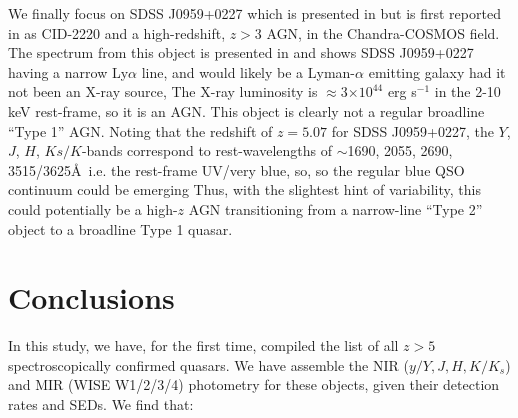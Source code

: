\documentclass[usenatbib]{mnras}
\begin{document}
We finally focus on SDSS J0959+0227 which is presented in
\citet{WangF2016} but is first reported in \citet{Civano2011} as
CID-2220 and a high-redshift, $z>3$ AGN, in the Chandra-COSMOS
field. The spectrum from this object is presented in \citet{Ikeda2012}
and shows SDSS J0959+0227 having a narrow Ly$\alpha$ line, and would
likely be a Lyman-$\alpha$ emitting galaxy had it not been an X-ray
source, The X-ray luminosity is $\approx$3$\times10^{44}$ erg s$^{-1}$
in the 2-10 keV rest-frame, so it is an AGN. This object is clearly
not a regular broadline ``Type 1'' AGN. Noting that the redshift of
$z=5.07$ for SDSS J0959+0227, the $Y$, $J$, $H$, $Ks/K$-bands
correspond to rest-wavelengths of $\sim$1690, 2055, 2690,
3515/3625\AA\ i.e. the rest-frame UV/very blue, so, so the regular
blue QSO continuum could be emerging Thus, with the slightest hint of
variability, this could potentially be a high-$z$ AGN transitioning
from a narrow-line ``Type 2'' object to a broadline Type 1 quasar.







\section{Conclusions}\label{sec:conclusions}
In this study, we have, for the first time, compiled the list of all
$z>5$ spectroscopically confirmed quasars. We have assemble the NIR
($y/Y, J, H, K/K_{s}$) and MIR (WISE W1/2/3/4) photometry for these
objects, given their detection rates and SEDs. We find that: 
\end{document}

